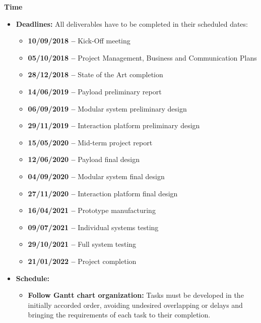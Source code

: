 \textbf{Time}

\begin{itemize}
	
	\item \textbf{Deadlines:} All deliverables have to be completed in their scheduled dates:
	
	\begin{itemize}
		
		\item \textbf{10/09/2018 – } Kick-Off meeting 
		
		\item \textbf{05/10/2018 – } Project Management, Business and Communication Plans
		
		\item \textbf{28/12/2018 – } State of the Art completion
		
		\item \textbf{14/06/2019 – } Payload preliminary report
		
		\item \textbf{06/09/2019 – } Modular system preliminary design
		
		\item \textbf{29/11/2019 – } Interaction platform preliminary design
		
		\item \textbf{15/05/2020 – } Mid-term project report
		
		\item \textbf{12/06/2020 – } Payload final design
		
		\item \textbf{04/09/2020 – } Modular system final design 
		
		\item \textbf{27/11/2020 – } Interaction platform final design
		
		\item \textbf{16/04/2021 – } Prototype manufacturing
		
		\item \textbf{09/07/2021 – } Individual systems testing 
		
		\item \textbf{29/10/2021 – } Full system testing
		
		\item \textbf{21/01/2022 – } Project completion
		
	\end{itemize}
	
	\item \textbf{Schedule:}
	
	\begin{itemize}
		
		\item \textbf{Follow Gantt chart organization:} Tasks must be developed in the initially accorded order, avoiding undesired overlapping or delays and bringing the requirements of each task to their completion.
		
	\end{itemize}
	

\end{itemize}

